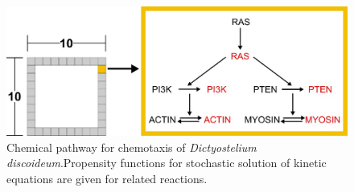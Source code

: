 \documentclass[10pt,letterpaper]{article}
\begin{document}
\begin{figure}
\includegraphics[scale=0.35]{Fig1.jpeg}
\caption{Chemical pathway for chemotaxis of \textit{Dictyostelium discoideum}.Propensity functions for stochastic solution of kinetic equations are given for related reactions.}
\label{Fig.1}
\end{figure}
\end{document}
